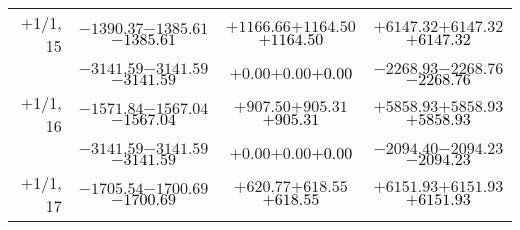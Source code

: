 \documentclass[compress]{beamer}
\begin{document}
\begin{frame}
{\begin{tabular}{r | c | c | c}
$+$1/1, 15 & $-1390.37$\hspace{0.1 cm}$-1385.61$\hspace{0.1 cm}\textcolor{black}{$-1385.61$} & $+1166.66$\hspace{0.1 cm}$+1164.50$\hspace{0.1 cm}\textcolor{black}{$+1164.50$} & $+6147.32$\hspace{0.1 cm}$+6147.32$\hspace{0.1 cm}\textcolor{black}{$+6147.32$} \\
           & $-3141.59$\hspace{0.1 cm}$-3141.59$\hspace{0.1 cm}\textcolor{black}{$-3141.59$} & $+0.00$\hspace{0.1 cm}$+0.00$\hspace{0.1 cm}\textcolor{black}{$+0.00$} & $-2268.93$\hspace{0.1 cm}$-2268.76$\hspace{0.1 cm}\textcolor{black}{$-2268.76$} \\
$+$1/1, 16 & $-1571.84$\hspace{0.1 cm}$-1567.04$\hspace{0.1 cm}\textcolor{black}{$-1567.04$} & $+907.50$\hspace{0.1 cm}$+905.31$\hspace{0.1 cm}\textcolor{black}{$+905.31$} & $+5858.93$\hspace{0.1 cm}$+5858.93$\hspace{0.1 cm}\textcolor{black}{$+5858.93$} \\
           & $-3141.59$\hspace{0.1 cm}$-3141.59$\hspace{0.1 cm}\textcolor{black}{$-3141.59$} & $+0.00$\hspace{0.1 cm}$+0.00$\hspace{0.1 cm}\textcolor{black}{$+0.00$} & $-2094.40$\hspace{0.1 cm}$-2094.23$\hspace{0.1 cm}\textcolor{black}{$-2094.23$} \\
$+$1/1, 17 & $-1705.54$\hspace{0.1 cm}$-1700.69$\hspace{0.1 cm}\textcolor{black}{$-1700.69$} & $+620.77$\hspace{0.1 cm}$+618.55$\hspace{0.1 cm}\textcolor{black}{$+618.55$} & $+6151.93$\hspace{0.1 cm}$+6151.93$\hspace{0.1 cm}\textcolor{black}{$+6151.93$} \\

\end{tabular}}
\end{frame}
\end{document}
